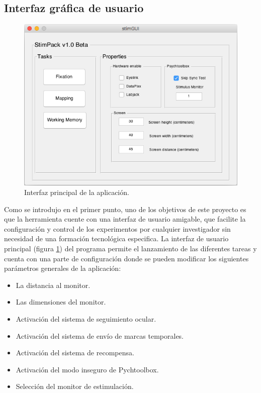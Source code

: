 \documentclass[conference]{IEEEtran}
\begin{document}
\subsection{Interfaz gráfica de usuario}
\begin{figure}[tp]
\centerline{\includegraphics[width=\linewidth]{figures/main_gui}}
\caption{Interfaz principal de la aplicación.}
\label{figmainGUI}
\end{figure}
Como se introdujo en el primer punto, uno de los objetivos de este proyecto es que la herramienta cuente con una interfaz de usuario amigable, que facilite la configuración y control de los experimentos por cualquier investigador sin necesidad de una formación tecnológica especifica.
La interfaz de usuario principal (figura \ref{figmainGUI}) del programa permite el lanzamiento de las diferentes tareas y cuenta con una parte de configuración donde se pueden modificar los siguientes parámetros generales de la aplicación:
\begin{itemize}
	\item La distancia al monitor.
	\item Las dimensiones del monitor.
	\item Activación del sistema de seguimiento ocular.
	\item Activación del sistema de envío de marcas temporales.
	\item Activación del sistema de recompensa.
	\item Activación del modo inseguro de Pychtoolbox.
	\item Selección del monitor de estimulación.
\end{itemize} 
\end{document}
